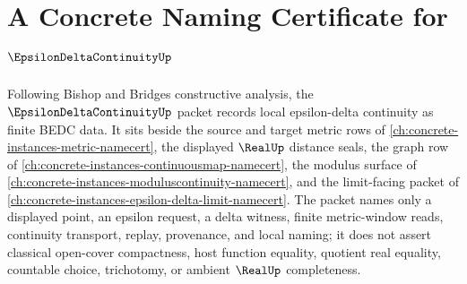 \chapter{A Concrete Naming Certificate for $\EpsilonDeltaContinuityUp$}
\label{ch:concrete-instances-epsilon-delta-continuity-namecert}

Following Bishop and Bridges constructive analysis, the $\EpsilonDeltaContinuityUp$ packet records local epsilon-delta continuity as finite BEDC data. It sits beside the source and target metric rows of \autoref{ch:concrete-instances-metric-namecert}, the displayed $\RealUp$ distance seals, the graph row of \autoref{ch:concrete-instances-continuousmap-namecert}, the modulus surface of \autoref{ch:concrete-instances-moduluscontinuity-namecert}, and the limit-facing packet of \autoref{ch:concrete-instances-epsilon-delta-limit-namecert}. The packet names only a displayed point, an epsilon request, a delta witness, finite metric-window reads, continuity transport, replay, provenance, and local naming; it does not assert classical open-cover compactness, host function equality, quotient real equality, countable choice, trichotomy, or ambient $\RealUp$ completeness.

